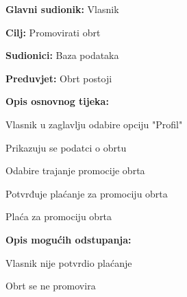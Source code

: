 			    	\noindent {}
					\begin{packed_item}
	
						\item \textbf{Glavni sudionik: } Vlasnik
						\item  \textbf{Cilj:} Promovirati obrt
						\item  \textbf{Sudionici:} Baza podataka
						\item  \textbf{Preduvjet:} Obrt postoji
						\item  \textbf{Opis osnovnog tijeka:}
						
						\item[] \begin{packed_enum}
	
							\item Vlasnik u zaglavlju odabire opciju "Profil"
							\item Prikazuju se podatci o obrtu
							\item Odabire trajanje promocije obrta
                                \item Potvrđuje plaćanje za promociju obrta
							\item Plaća za promociju obrta
							
						\end{packed_enum}
						
						\item  \textbf{Opis mogućih odstupanja:}
						
						\item[] \begin{packed_item}
	                        \item [4.a] Vlasnik nije potvrdio plaćanje
	                        \item[] \begin{packed_enum}
								
								\item Obrt se ne promovira
								
							\end{packed_enum}
						\end{packed_item}
					\end{packed_item}
                
